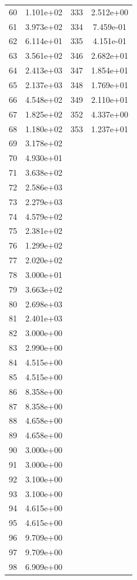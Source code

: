 \documentclass[12pt]{article}
\begin{document}
\begin{longtable}{@{}cccc@{}}
60 & 1.101e+02 & 333 & 2.512e+00 \\
61 & 3.973e+02 & 334 & 7.459e-01 \\
62 & 6.114e+01 & 335 & 4.151e-01 \\
63 & 3.561e+02 & 346 & 2.682e+01 \\
64 & 2.413e+03 & 347 & 1.854e+01 \\
65 & 2.137e+03 & 348 & 1.769e+01 \\
66 & 4.548e+02 & 349 & 2.110e+01 \\
67 & 1.825e+02 & 352 & 4.337e+00 \\
68 & 1.180e+02 & 353 & 1.237e+01 \\
69 & 3.178e+02 &  &  \\
70 & 4.930e+01 &  &  \\
71 & 3.638e+02 &  &  \\
72 & 2.586e+03 &  &  \\
73 & 2.279e+03 &  &  \\
74 & 4.579e+02 &  &  \\
75 & 2.381e+02 &  &  \\
76 & 1.299e+02 &  &  \\
77 & 2.020e+02 &  &  \\
78 & 3.000e+01 &  &  \\
79 & 3.663e+02 &  &  \\
80 & 2.698e+03 &  &  \\
81 & 2.401e+03 &  &  \\
82 & 3.000e+00 &  &  \\
83 & 2.990e+00 &  &  \\
84 & 4.515e+00 &  &  \\
85 & 4.515e+00 &  &  \\
86 & 8.358e+00 &  &  \\
87 & 8.358e+00 &  &  \\
88 & 4.658e+00 &  &  \\
89 & 4.658e+00 &  &  \\
90 & 3.000e+00 &  &  \\
91 & 3.000e+00 &  &  \\
92 & 3.100e+00 &  &  \\
93 & 3.100e+00 &  &  \\
94 & 4.615e+00 &  &  \\
95 & 4.615e+00 &  &  \\
96 & 9.709e+00 &  &  \\
97 & 9.709e+00 &  &  \\
98 & 6.909e+00 &  &  \\

\end{longtable}
\end{document}
